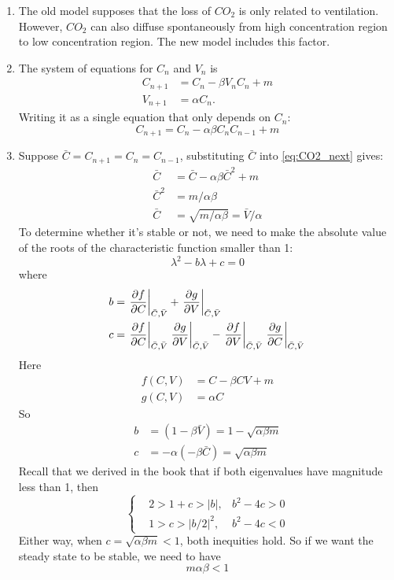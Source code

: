 \begin{homeworkProblem}
\begin{enumerate}
\item The old model supposes that the loss of $CO_2$ is only related to
ventilation. However, $CO_2$ can also diffuse spontaneously from high
concentration region to low concentration region. The new model includes this
factor.

\item The system of equations for $C_n$ and $V_n$ is \begin{align}
    C_{n+1} &= C_{n} - \beta V_nC_n + m\\
    V_{n+1} &= \alpha C_n.
\end{align}
Writing it as a single equation that only depends on $C_n$: \begin{equation}
    C_{n+1} = C_{n} - \alpha\beta C_n C_{n-1} + m \label{eq:CO2_next}
\end{equation}

\item Suppose $\bar C = C_{n+1} = C_n = C_{n-1}$, substituting $\bar C$ into
\eqref{eq:CO2_next} gives: \[
    \begin{aligned}
    \bar C &= \bar C - \alpha\beta\bar C^2 + m\\
    \bar C^2 &= m/\alpha\beta\\
    \bar C &= \sqrt{m/\alpha\beta} = \bar V/\alpha
    \end{aligned}
\]
To determine whether it's stable or not, we need to make the absolute value of
the roots of the characteristic function smaller than 1: \[
    \lambda^2 - b \lambda + c = 0
\]
where \[
    \begin{aligned}
        b &= \left.\frac{\partial f}{\partial C}\right|_{\bar C, \bar V} +
        \left.\frac{\partial g}{\partial V}\right|_{\bar C, \bar V} \\
        c &= \left.\frac{\partial f}{\partial C}\right|_{\bar C, \bar V}
        \left.\frac{\partial g}{\partial V}\right|_{\bar C, \bar V} -
        \left.\frac{\partial f}{\partial V}\right|_{\bar C, \bar V}
        \left.\frac{\partial g}{\partial C}\right|_{\bar C, \bar V}
    \end{aligned}
\]
Here \[
    \begin{aligned}
        f(C, V) &= C - \beta CV + m\\
        g(C, V) &= \alpha C
    \end{aligned}
\]
So \[
    \begin{aligned}
        b &= (1- \beta \bar V) = 1 - \sqrt{\alpha\beta m}\\
        c &= -\alpha(-\beta \bar C) = \sqrt{\alpha\beta m}
    \end{aligned}
\]
Recall that we derived in the book that if both eigenvalues have magnitude less
than 1, then \[
    \left\{
    \begin{aligned}
        &2 > 1 + c > |b|, & b^2 - 4c > 0\\
        &1 > c > |b/2|^2, & b^2 - 4c < 0
    \end{aligned}
    \right.
\]
Either way, when $c = \sqrt{\alpha\beta m} < 1$, both inequities hold. So
if we want the steady state to be stable, we need to have \[
    m\alpha \beta < 1
\]


\end{enumerate}
\end{homeworkProblem}
